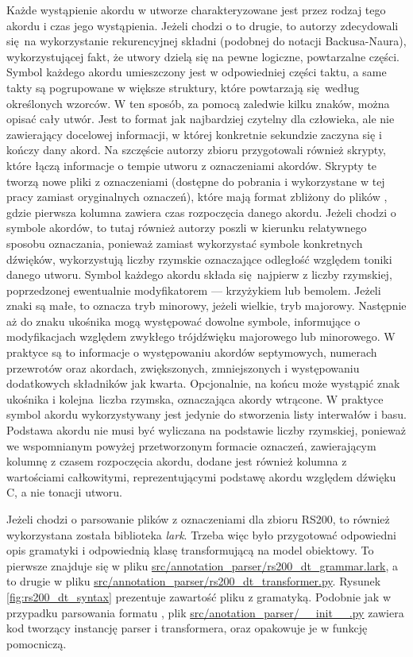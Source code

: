 Każde wystąpienie akordu w utworze charakteryzowane jest przez rodzaj tego akordu i czas jego wystąpienia. Jeżeli chodzi o to drugie, to autorzy zdecydowali się na wykorzystanie rekurencyjnej składni (podobnej do notacji Backusa-Naura), wykorzystującej fakt, że utwory dzielą się na pewne logiczne, powtarzalne części. Symbol każdego akordu umieszczony jest w odpowiedniej części taktu, a same takty są pogrupowane w większe struktury, które powtarzają się według określonych wzorców. W ten sposób, za pomocą zaledwie kilku znaków, można opisać cały utwór. Jest to format jak najbardziej czytelny dla człowieka, ale nie zawierający docelowej informacji, w której konkretnie sekundzie zaczyna się i kończy dany akord. Na szczęście autorzy zbioru przygotowali również skrypty, które łączą informacje o tempie utworu z oznaczeniami akordów. Skrypty te tworzą nowe pliki z oznaczeniami (dostępne do pobrania i wykorzystane w tej pracy zamiast oryginalnych oznaczeń), które mają format zbliżony do plików , gdzie pierwsza kolumna zawiera czas rozpoczęcia danego akordu. Jeżeli chodzi o symbole akordów, to tutaj również autorzy poszli w kierunku relatywnego sposobu oznaczania, ponieważ zamiast wykorzystać symbole konkretnych dźwięków, wykorzystują liczby rzymskie oznaczające odległość względem toniki danego utworu.  Symbol każdego akordu składa się najpierw z liczby rzymskiej, poprzedzonej ewentualnie modyfikatorem --- krzyżykiem lub bemolem. Jeżeli znaki są małe, to oznacza tryb minorowy, jeżeli wielkie, tryb majorowy. Następnie aż do znaku ukośnika mogą występować dowolne symbole, informujące o modyfikacjach względem zwykłego trójdźwięku majorowego lub minorowego. W praktyce są to informacje o występowaniu akordów septymowych, numerach przewrotów oraz akordach, zwiększonych, zmniejszonych i występowaniu dodatkowych składników jak kwarta. Opcjonalnie, na końcu może wystąpić znak ukośnika i kolejna liczba rzymska, oznaczająca akordy wtrącone. W praktyce symbol akordu wykorzystywany jest jedynie do stworzenia listy interwałów i basu.  Podstawa akordu nie musi być wyliczana na podstawie liczby rzymskiej, ponieważ we wspomnianym powyżej przetworzonym formacie oznaczeń, zawierającym kolumnę z czasem rozpoczęcia akordu, dodane jest również kolumna z wartościami całkowitymi, reprezentującymi podstawę akordu względem dźwięku C, a nie tonacji utworu.

Jeżeli chodzi o parsowanie plików z oznaczeniami dla zbioru RS200, to również wykorzystana została biblioteka \emph{lark}. Trzeba więc było przygotować odpowiedni opis gramatyki i odpowiednią klasę transformującą na model obiektowy. To pierwsze znajduje się w pliku \url{src/annotation_parser/rs200_dt_grammar.lark}, a to drugie w pliku \url{src/annotation_parser/rs200_dt_transformer.py}. Rysunek \ref{fig:rs200_dt_syntax} prezentuje zawartość pliku z gramatyką. Podobnie jak w przypadku parsowania formatu , plik \url{src/anotation_parser/__init__.py} zawiera kod tworzący instancję parser i transformera, oraz opakowuje je w funkcję pomocniczą.

